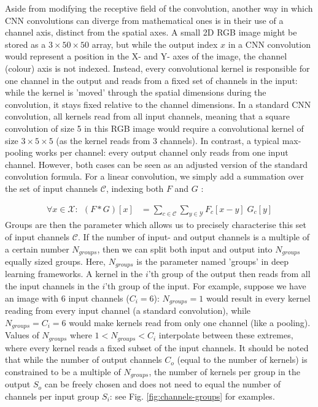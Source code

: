 \documentclass[a4paper, 12pt]{report}
\begin{document}
Aside from modifying the receptive field of the convolution, another way in which CNN convolutions can diverge from mathematical ones is in their use of a channel axis, distinct from the spatial axes. A small 2D RGB image might be stored as a $3\times50\times50$ array, but while the output index $x$ in a CNN convolution would represent a position in the X- and Y- axes of the image, the channel (colour) axis is not indexed. Instead, every convolutional kernel is responsible for one channel in the output and reads from a fixed set of channels in the input: while the kernel is 'moved' through the spatial dimensions during the convolution, it stays fixed relative to the channel dimensions. In a standard CNN convolution, all kernels read from all input channels, meaning that a square convolution of size 5 in this RGB image would require a convolutional kernel of size $3\times5\times5$ (as the kernel reads from 3 channels). In contrast, a typical max-pooling works per channel: every output channel only reads from one input channel. However, both cases can be seen as an adjusted version of the standard convolution formula. For a linear convolution, we simply add a summation over the set of input channels $\mathcal{C}$, indexing both $F$ and $G$ \cite{noauthor_conv2d_nodate}:

\begin{align}
\forall x\in\mathcal{X}:~~(F*G)[x] &= \sum_{c\in\mathcal{C}} \sum_{y\in\mathcal{Y}} F_c[x-y]\; G_c[y]
\end{align}
\noindent
Groups are then the parameter which allows us to precisely characterise this set of input channels $\mathcal{C}$. If the number of input- and output channels is a multiple of a certain number $N_{groups}$, then we can split both input and output into $N_{groups}$ equally sized groups. Here, $N_{groups}$ is the parameter named 'groups' in deep learning frameworks. A kernel in the $i$'th group of the output then reads from all the input channels in the $i$'th group of the input. For example, suppose we have an image with 6 input channels ($C_i=6$): $N_{groups}=1$ would result in every kernel reading from every input channel (a standard convolution), while $N_{groups}=C_i=6$ would make kernels read from only one channel (like a pooling). Values of $N_{groups}$ where $1<N_{groups}<C_i$ interpolate between these extremes, where every kernel reads a fixed subset of the input channels. It should be noted that while the number of output channels $C_o$ (equal to the number of kernels) is constrained to be a multiple of $N_{groups}$, the number of kernels per group in the output $S_o$ can be freely chosen and does not need to equal the number of channels per input group $S_i$: see Fig. \ref{fig:channels-groups} for examples.
\end{document}
